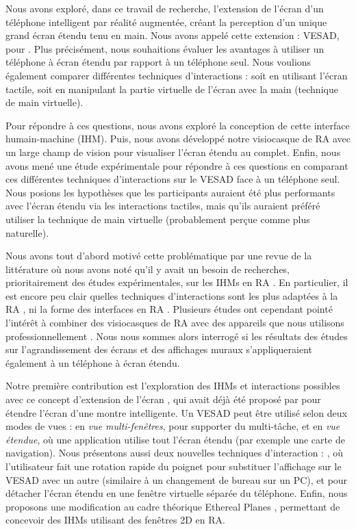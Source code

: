 Nous avons exploré, dans ce travail de recherche, l'extension de l'écran d'un téléphone intelligent par réalité augmentée, créant la perception d'un unique grand écran étendu tenu en main. Nous avons appelé cette extension : VESAD, pour . Plus précisément, nous souhaitions évaluer les avantages à utiliser un téléphone à écran étendu par rapport à un téléphone seul. Nous voulions également comparer différentes techniques d'interactions : soit en utilisant l'écran tactile, soit en manipulant la partie virtuelle de l'écran avec la main (technique de main virtuelle).

Pour répondre à ces questions, nous avons exploré la conception de cette interface humain-machine (IHM). Puis, nous avons développé notre visiocasque de RA avec un large champ de vision pour visualiser l'écran étendu au complet. Enfin, nous avons mené une étude expérimentale pour répondre à ces questions en comparant ces différentes techniques d'interactions sur le VESAD face à un téléphone seul. Nous posions les hypothèses que les participants auraient été plus performants avec l'écran étendu via les interactions tactiles, mais qu'ils auraient préféré utiliser la technique de main virtuelle (probablement perçue comme plus naturelle).

Nous avons tout d'abord motivé cette problématique par une revue de la littérature  où nous avons noté qu'il y avait un besoin de recherches, prioritairement des études expérimentales, sur les IHMs en RA \citep{Billinghurst2005, Billinghurst2015}. En particulier, il est encore peu clair quelles techniques d'interactions sont les plus adaptées à la RA \citep{Argelaguet2013, Piumsomboon2013, Piumsomboon2014}, ni la forme des interfaces en RA \citep{VanDam1997, Ens2014a, Serrano2015}. Plusieurs études ont cependant pointé l'intérêt à combiner des visiocasques de RA avec des appareils que nous utilisons professionnellement \citep{Grubert2015, Serrano2015a}. Nous nous sommes alors interrogé si les résultats des études sur l'agrandissement des écrans \cite{Baudisch2002, Guiard2004} et des affichages muraux \cite{Liu2014, Raedle2014} s'appliqueraient également à un téléphone à écran étendu.

Notre première contribution est l'exploration des IHMs et interactions possibles avec ce concept d'extension de l'écran , qui avait déjà été proposé par \cite{Grubert2015} pour étendre l'écran d'une montre intelligente. Un VESAD peut être utilisé selon deux modes de vues : en \emph{vue multi-fenêtres}, pour supporter du multi-tâche, et en \emph{vue étendue}, où une application utilise tout l'écran étendu (par exemple une carte de navigation). Nous présentons aussi deux nouvelles techniques d'interaction : , où l'utilisateur fait une rotation rapide du poignet pour substituer l'affichage sur le VESAD avec un autre (similaire à un changement de bureau sur un PC), et  pour détacher l'écran étendu en une fenêtre virtuelle séparée du téléphone. Enfin, nous proposons une modification au cadre théorique Ethereal Planes \citep{Ens2014a}, permettant de concevoir des IHMs utilisant des fenêtres 2D en RA.

